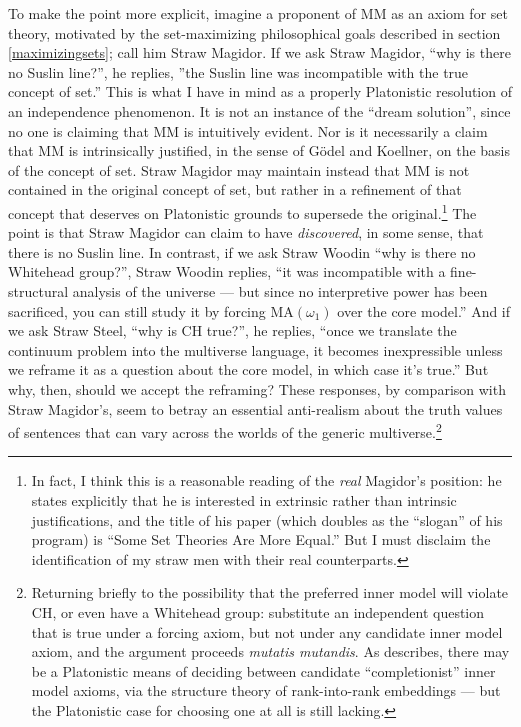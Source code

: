 \documentclass[letterpaper,12pt]{article}
\begin{document}
To make the point more explicit, imagine a proponent of MM as an axiom for set theory, motivated by the set-maximizing philosophical goals described in section \ref{maximizingsets}; call him Straw Magidor. If we ask Straw Magidor, ``why is there no Suslin line?'', he replies, ''the Suslin line was incompatible with the true concept of set.'' This is what I have in mind as a properly Platonistic  resolution of an independence phenomenon. It is not an instance of the ``dream solution'', since no one is claiming that MM is intuitively evident. Nor is it necessarily a claim that MM is intrinsically justified, in the sense of G\"odel and Koellner, on the basis of the concept of set. Straw Magidor may maintain instead that MM is not contained in the original concept of set, but rather in a refinement of that concept that deserves on Platonistic grounds to supersede the original.\footnote{In fact, I think this is a reasonable reading of the \emph{real} Magidor's position: he states explicitly that he is interested in extrinsic rather than intrinsic justifications, and the title of his paper (which doubles as the ``slogan'' of his program) is ``Some Set Theories Are More Equal.'' But I must disclaim the identification of my straw men with their real counterparts.} The point is that Straw Magidor can claim to have \emph{discovered}, in some sense, that there is no Suslin line. In contrast, if we ask Straw Woodin ``why is there no Whitehead group?'', Straw Woodin replies, ``it was incompatible with a fine-structural analysis of the universe --- but since no interpretive power has been sacrificed, you can still study it by forcing $\mathrm{MA}(\omega_1)$ over the core model.'' And if we ask Straw Steel, ``why is CH true?'', he replies, ``once we translate the continuum problem into the multiverse language, it becomes inexpressible unless we reframe it as a question about the core model, in which case it's true.'' But why, then, should we accept the reframing? These responses, by comparison with Straw Magidor's, seem to betray an essential anti-realism about the truth values of sentences that can vary across the worlds of the generic multiverse.\footnote{Returning briefly to the possibility that the preferred inner model will violate CH, or even have a Whitehead group: substitute an independent question that is true under a forcing axiom, but not under any candidate inner model axiom, and the argument proceeds \emph{mutatis mutandis}. As \cite{sep-continuum-hypothesis} describes, there may be a Platonistic means of deciding between candidate ``completionist'' inner model axioms, via the structure theory of rank-into-rank embeddings --- but the Platonistic case for choosing one at all is still lacking.}
\end{document}

